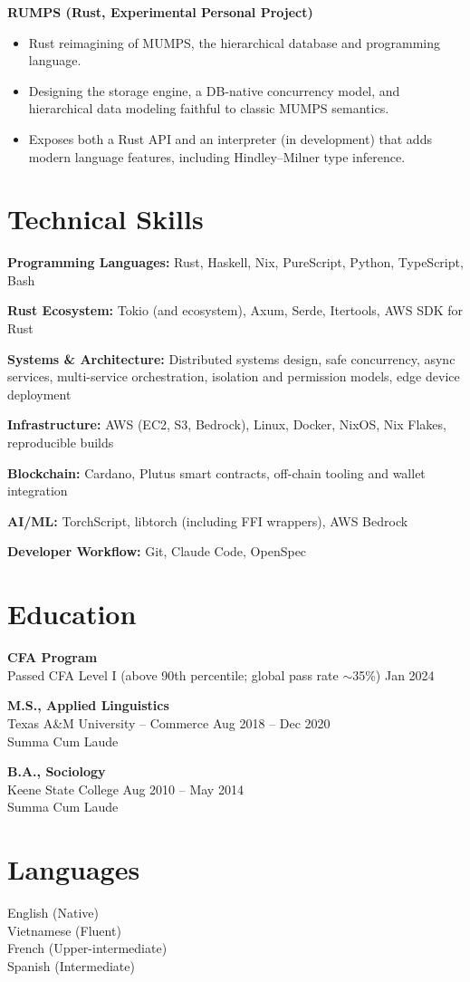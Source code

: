 \documentclass[10.5pt]{article}
\begin{document}
\textbf{RUMPS (Rust, Experimental Personal Project)}

\begin{itemize}
    \item Rust reimagining of MUMPS, the hierarchical database and programming language.
    \item Designing the storage engine, a DB-native concurrency model, and hierarchical data modeling faithful to classic MUMPS semantics.
    \item Exposes both a Rust API and an interpreter (in development) that adds modern language features, including Hindley--Milner type inference.
\end{itemize}

\section*{Technical Skills}

\textbf{Programming Languages:} Rust, Haskell, Nix, PureScript, Python, TypeScript, Bash

\textbf{Rust Ecosystem:} Tokio (and ecosystem), Axum, Serde, Itertools, AWS SDK for Rust

\textbf{Systems \& Architecture:} Distributed systems design, safe concurrency, async services, multi-service orchestration, isolation and permission models, edge device deployment

\textbf{Infrastructure:} AWS (EC2, S3, Bedrock), Linux, Docker, NixOS, Nix Flakes, reproducible builds

\textbf{Blockchain:} Cardano, Plutus smart contracts, off-chain tooling and wallet integration

\textbf{AI/ML:} TorchScript, libtorch (including FFI wrappers), AWS Bedrock

\textbf{Developer Workflow:} Git, Claude Code, OpenSpec

\section*{Education}

\textbf{CFA Program} \\
Passed CFA Level I (above 90th percentile; global pass rate $\sim$35\%) \hfill Jan 2024

\vspace{6pt}

\textbf{M.S., Applied Linguistics} \\
Texas A\&M University -- Commerce \hfill Aug 2018 -- Dec 2020 \\
Summa Cum Laude

\vspace{6pt}

\textbf{B.A., Sociology} \\
Keene State College \hfill Aug 2010 -- May 2014 \\
Summa Cum Laude

\section*{Languages}

English (Native) \\
Vietnamese (Fluent) \\
French (Upper-intermediate) \\
Spanish (Intermediate)
\end{document}
